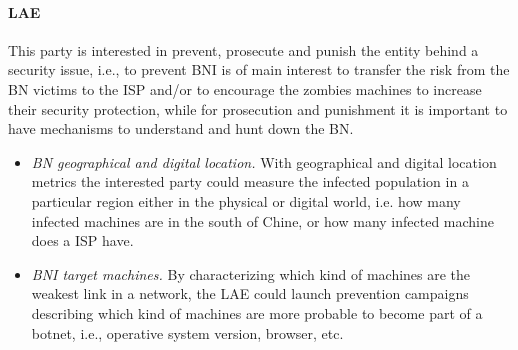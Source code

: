 \paragraph{LAE}
This party is interested in prevent, prosecute and punish the entity behind a security issue, i.e., to prevent BNI is of main interest to transfer the risk from the BN victims to the ISP and/or to encourage the zombies machines to increase their security protection, while for prosecution and punishment it is important to have mechanisms to understand and hunt down the BN.
\begin{itemize}
    \item \textit{BN geographical and digital location.} With geographical and digital location metrics the interested party could measure the infected population in a particular region either in the  physical or digital world, i.e. how many infected machines are in the south of Chine, or how many infected machine does a ISP have.
    \item \textit{BNI target machines.} By characterizing which kind of machines are the weakest link in a network, the LAE could launch prevention campaigns describing which kind of machines are more probable to become part of a botnet, i.e., operative system version, browser, etc.
\end{itemize}



